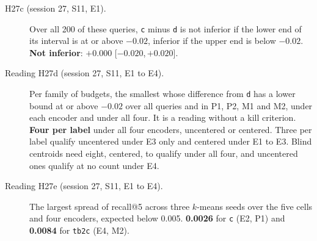\documentclass[11pt]{article}
\newcommand{\rep}[1]{\texttt{#1}}
\newcommand{\ci}[2]{[\ensuremath{#1},\,\ensuremath{#2}]}  %
\begin{document}
\begin{description}
\item[H27c (session 27, S11, E1).] Over all 200 of these queries, \rep{c} minus \rep{d} is not inferior if the lower end of its interval is at or above $-0.02$, inferior if the upper end is below $-0.02$. \textbf{Not inferior}: $+0.000$ \ci{-0.020}{+0.020}.
\item[Reading H27d (session 27, S11, E1 to E4).] Per family of budgets, the smallest whose difference from \rep{d} has a lower bound at or above $-0.02$ over all queries and in P1, P2, M1 and M2, under each encoder and under all four. It is a reading without a kill criterion. \textbf{Four per label} under all four encoders, uncentered or centered. Three per label qualify uncentered under E3 only and centered under E1 to E3. Blind centroids need eight, centered, to qualify under all four, and uncentered ones qualify at no count under E4.
\item[Reading H27e (session 27, S11, E1 to E4).] The largest spread of recall@5 across three $k$-means seeds over the five cells and four encoders, expected below 0.005. \textbf{0.0026} for \rep{c} (E2, P1) and \textbf{0.0084} for \rep{tb2c} (E4, M2).
\end{description}
\end{document}
